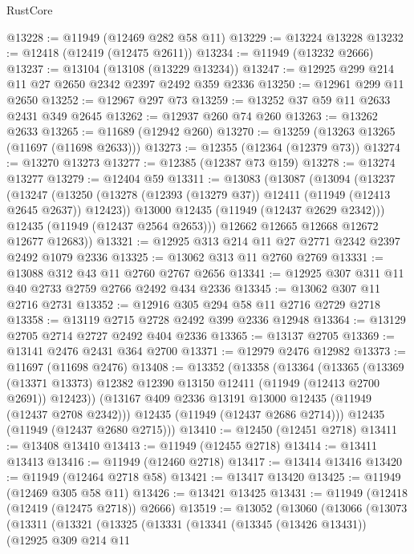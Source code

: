 \begin{lexlean}{RustCore}
\begin{coremodule}
@13228 := @11949 (@12469 @282 @58 @11)
@13229 := @13224 @13228
@13232 := @12418 (@12419 (@12475 @2611))
@13234 := @11949 (@13232 @2666)
@13237 := @13104 (@13108 (@13229 @13234))
@13247 := @12925 @299 @214 @11 @27 @2650 @2342 @2397 @2492 @359 @2336
@13250 := @12961 @299 @11 @2650
@13252 := @12967 @297 @73
@13259 := @13252 @37 @59 @11 @2633 @2431 @349 @2645
@13262 := @12937 @260 @74 @260
@13263 := @13262 @2633
@13265 := @11689 (@12942 @260)
@13270 := @13259 (@13263 @13265 (@11697 (@11698 @2633)))
@13273 := @12355 (@12364 (@12379 @73))
@13274 := @13270 @13273
@13277 := @12385 (@12387 @73 @159)
@13278 := @13274 @13277
@13279 := @12404 @59
@13311 := @13083
    (@13087
      (@13094
        (@13237
          (@13247
            (@13250 (@13278 (@12393 (@13279 @37)) @12411 (@11949 (@12413 @2645 @2637)) @12423))
            @13000
            @12435
            (@11949 (@12437 @2629 @2342)))
          @12435
          (@11949 (@12437 @2564 @2653)))
        @12662
        @12665
        @12668
        @12672
        @12677
        @12683))
@13321 := @12925 @313 @214 @11 @27 @2771 @2342 @2397 @2492 @1079 @2336
@13325 := @13062 @313 @11 @2760 @2769
@13331 := @13088 @312 @43 @11 @2760 @2767 @2656
@13341 := @12925 @307 @311 @11 @40 @2733 @2759 @2766 @2492 @434 @2336
@13345 := @13062 @307 @11 @2716 @2731
@13352 := @12916 @305 @294 @58 @11 @2716 @2729 @2718
@13358 := @13119 @2715 @2728 @2492 @399 @2336 @12948
@13364 := @13129 @2705 @2714 @2727 @2492 @404 @2336
@13365 := @13137 @2705
@13369 := @13141 @2476 @2431 @364 @2700
@13371 := @12979 @2476 @12982
@13373 := @11697 (@11698 @2476)
@13408 := @13352
    (@13358
      (@13364
        (@13365
          (@13369 (@13371 @13373) @12382 @12390 @13150 @12411 (@11949 (@12413 @2700 @2691)) @12423))
        (@13167 @409 @2336 @13191 @13000 @12435 (@11949 (@12437 @2708 @2342)))
        @12435
        (@11949 (@12437 @2686 @2714)))
      @12435
      (@11949 (@12437 @2680 @2715)))
@13410 := @12450 (@12451 @2718)
@13411 := @13408 @13410
@13413 := @11949 (@12455 @2718)
@13414 := @13411 @13413
@13416 := @11949 (@12460 @2718)
@13417 := @13414 @13416
@13420 := @11949 (@12464 @2718 @58)
@13421 := @13417 @13420
@13425 := @11949 (@12469 @305 @58 @11)
@13426 := @13421 @13425
@13431 := @11949 (@12418 (@12419 (@12475 @2718)) @2666)
@13519 := @13052
    (@13060
      (@13066
        (@13073
          (@13311
            (@13321
              (@13325
                (@13331
                  (@13341
                    (@13345 (@13426 @13431))
                    (@12925
                      @309
                      @214
                      @11

\end{coremodule}
\end{lexlean}
